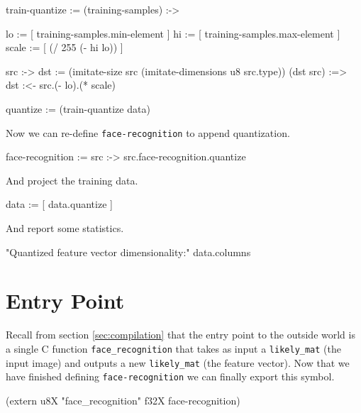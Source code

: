 \documentclass{article}
\begin{document}
\begin{likely}
train-quantize :=
  (training-samples) :->
  {
    lo    := [ training-samples.min-element  ]
    hi    := [ training-samples.max-element  ]
    scale := [ (/ 255 (- hi lo)) ]

    src :->
    {
      dst := (imitate-size src (imitate-dimensions u8 src.type))
      (dst src) :=>
        dst :<- src.(- lo).(* scale)
    }
  }

quantize := (train-quantize data)
\end{likely}

Now we can re-define \texttt{face-recognition} to append quantization.

\begin{likely}
face-recognition :=
  src :->
    src.face-recognition.quantize
\end{likely}

And project the training data.

\begin{likely}
data := [ data.quantize ]
\end{likely}

And report some statistics.

\begin{likely}
"Quantized feature vector dimensionality:"
data.columns
\end{likely}

\section{Entry Point}
Recall from section \ref{sec:compilation} that the entry point to the outside world is a single C function \texttt{face\_recognition} that takes as input a \texttt{likely\_mat} (the input image) and outputs a new \texttt{likely\_mat} (the feature vector). Now that we have finished defining \texttt{face-recognition} we can finally export this symbol.

\begin{likely}
(extern u8X "face_recognition" f32X face-recognition)
\end{likely}
\end{document}

